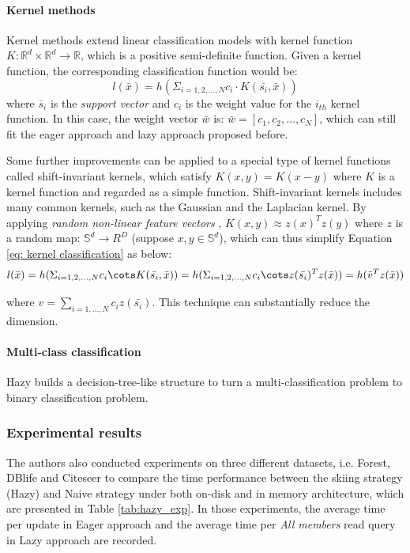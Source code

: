 \paragraph{Kernel methods}
Kernel methods extend linear classification models with kernel function $K: \mathbb{R}^d \times \mathbb{R}^d \rightarrow \mathbb{R}$, which is a positive semi-definite function. Given a kernel function, the corresponding classification function would be:
\begin{equation}\label{eq: kernel classification}
    l(\bar{x})=h(\Sigma_{i=1,2,\dots,N}c_i\cdot K(\bar{s_i}, \bar{x}))
\end{equation}
where $\bar{s}_i$ is the {\em support vector} and $c_i$ is the weight value for the $i_{th}$ kernel function. In this case, the weight vector $\bar{w}$ is: $\bar{w} = [c_1, c_2,\dots, c_N]$, which can still fit the eager approach and lazy approach proposed before.

Some further improvements can be applied to a special type of kernel functions called shift-invariant kernels, which satisfy $K(x, y) = K(x-y)$ where $K$ is a kernel function and regarded as a simple function. Shift-invariant kernels includes many common kernels, such as the Gaussian and the Laplacian kernel. By applying {\em random non-linear feature vectors} \cite{rahimi2008random}, $K(x, y) \approx z(x)^Tz(y)$ where $z$ is a random map: $\mathbb{S}^d \rightarrow R^D$ (suppose $x, y \in \mathbb{S}^d$), which can thus simplify Equation \ref{eq: kernel classification} as below:
\begin{equation}
    l(\bar{x})=h(\Sigma_{i=1,2,\dots,N}c_i\cots K(\bar{s_i}, \bar{x})) = h(\Sigma_{i=1,2,\dots,N}c_i\cots z(\bar{s_i})^T z(\bar{x}))=h(\bar{v}^T z(\bar{x}))
\end{equation}

where $v=\sum_{i=1,\dots,N}c_i z(\bar{s_i})$. This technique can substantially reduce the dimension.

\paragraph{Multi-class classification}
Hazy builds a decision-tree-like structure to turn a multi-classification problem to binary classification problem.

\subsubsection{Experimental results}
The authors also conducted experiments on three different datasets, i.e. Forest, DBlife and Citeseer to compare the time performance between the skiing strategy (Hazy) and Naive strategy under both on-disk and in memory architecture, which are presented in Table \ref{tab:hazy_exp}. In those experiments, the average time per update in Eager approach and the average time per {\em All members} read query in Lazy approach are recorded.

